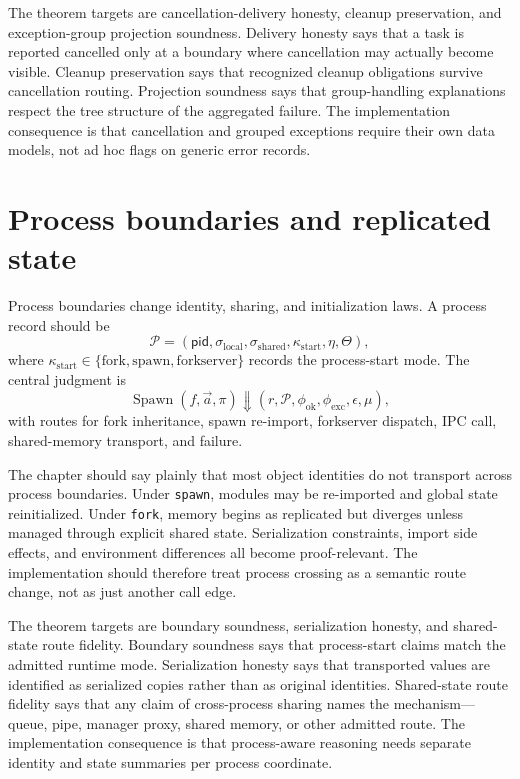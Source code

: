 \documentclass[11pt]{report}
\begin{document}
The theorem targets are cancellation-delivery honesty, cleanup preservation, and exception-group projection soundness. Delivery honesty says that a task is reported cancelled only at a boundary where cancellation may actually become visible. Cleanup preservation says that recognized cleanup obligations survive cancellation routing. Projection soundness says that group-handling explanations respect the tree structure of the aggregated failure. The implementation consequence is that cancellation and grouped exceptions require their own data models, not ad hoc flags on generic error records.
\section{Process boundaries and replicated state}
Process boundaries change identity, sharing, and initialization laws. A process record should be
\[
\mathcal{P} = (\mathsf{pid},\sigma_{\mathrm{local}},\sigma_{\mathrm{shared}},\kappa_{\mathrm{start}},\eta,\Theta),
\]
where $\kappa_{\mathrm{start}}\in\{\mathrm{fork},\mathrm{spawn},\mathrm{forkserver}\}$ records the process-start mode. The central judgment is
\[
\operatorname{Spawn}(f,\vec{a},\pi) \Downarrow (r,\mathcal{P},\phi_{\mathrm{ok}},\phi_{\mathrm{exc}},\epsilon,\mu),
\]
with routes for fork inheritance, spawn re-import, forkserver dispatch, IPC call, shared-memory transport, and failure.

The chapter should say plainly that most object identities do not transport across process boundaries. Under \texttt{spawn}, modules may be re-imported and global state reinitialized. Under \texttt{fork}, memory begins as replicated but diverges unless managed through explicit shared state. Serialization constraints, import side effects, and environment differences all become proof-relevant. The implementation should therefore treat process crossing as a semantic route change, not as just another call edge.

The theorem targets are boundary soundness, serialization honesty, and shared-state route fidelity. Boundary soundness says that process-start claims match the admitted runtime mode. Serialization honesty says that transported values are identified as serialized copies rather than as original identities. Shared-state route fidelity says that any claim of cross-process sharing names the mechanism---queue, pipe, manager proxy, shared memory, or other admitted route. The implementation consequence is that process-aware reasoning needs separate identity and state summaries per process coordinate.
\end{document}
